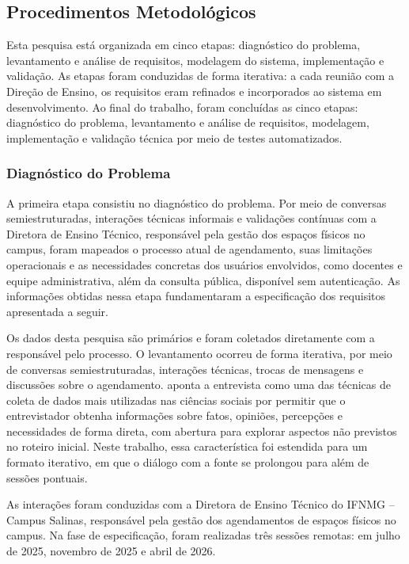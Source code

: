 \documentclass[
	12pt,				%
	twoside,			%
	openany,			%
	a4paper,			%
	chapter=TITLE,		%
	section=TITLE,		%
	subsection=TITLE,	%
	subsubsection=TITLE,%
	english,			%
	french,				%
	spanish,			%
	brazil,				%
	]{abntex2}
\begin{document}
\subsection{Procedimentos Metodológicos}
\label{sec:procedimentos}

Esta pesquisa está organizada em cinco etapas: diagnóstico do problema, levantamento e análise de requisitos, modelagem do sistema, implementação e validação. As etapas foram conduzidas de forma iterativa: a cada reunião com a Direção de Ensino, os requisitos eram refinados e incorporados ao sistema em desenvolvimento. Ao final do trabalho, foram concluídas as cinco etapas: diagnóstico do problema, levantamento e análise de requisitos, modelagem, implementação e validação técnica por meio de testes automatizados.

\subsubsection{Diagnóstico do Problema}
\label{sec:coleta}

A primeira etapa consistiu no diagnóstico do problema. Por meio de conversas semiestruturadas, interações técnicas informais e validações contínuas com a Diretora de Ensino Técnico, responsável pela gestão dos espaços físicos no campus, foram mapeados o processo atual de agendamento, suas limitações operacionais e as necessidades concretas dos usuários envolvidos, como docentes e equipe administrativa, além da consulta pública, disponível sem autenticação. As informações obtidas nessa etapa fundamentaram a especificação dos requisitos apresentada a seguir.

Os dados desta pesquisa são primários e foram coletados diretamente com a responsável pelo processo. O levantamento ocorreu de forma iterativa, por meio de conversas semiestruturadas, interações técnicas, trocas de mensagens e discussões sobre o agendamento.  aponta a entrevista como uma das técnicas de coleta de dados mais utilizadas nas ciências sociais por permitir que o entrevistador obtenha informações sobre fatos, opiniões, percepções e necessidades de forma direta, com abertura para explorar aspectos não previstos no roteiro inicial. Neste trabalho, essa característica foi estendida para um formato iterativo, em que o diálogo com a fonte se prolongou para além de sessões pontuais.

As interações foram conduzidas com a Diretora de Ensino Técnico do IFNMG -- Campus Salinas, responsável pela gestão dos agendamentos de espaços físicos no campus. Na fase de especificação, foram realizadas três sessões remotas: em julho de 2025, novembro de 2025 e abril de 2026.
\end{document}
